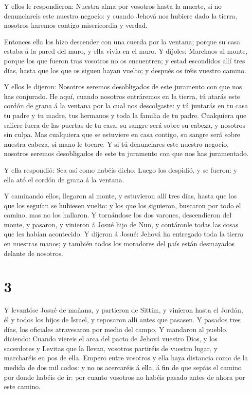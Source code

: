  Y ellos le respondieron: Nuestra alma por vosotros hasta
la muerte, si no denunciareis este nuestro negocio: y cuando Jehová nos
hubiere dado la tierra, nosotros haremos contigo misericordia y verdad.

 Entonces ella los hizo descender con una cuerda por la
ventana; porque su casa estaba á la pared del muro, y ella vivía en el
muro.  Y díjoles: Marchaos al monte, porque los que fueron
tras vosotros no os encuentren; y estad escondidos allí tres días, hasta
que los que os siguen hayan vuelto; y después os iréis vuestro camino.

 Y ellos le dijeron: Nosotros seremos desobligados de este
juramento con que nos has conjurado.  He aquí, cuando
nosotros entráremos en la tierra, tú atarás este cordón de grana á la
ventana por la cual nos descolgaste: y tú juntarás en tu casa tu padre y
tu madre, tus hermanos y toda la familia de tu padre. 
Cualquiera que saliere fuera de las puertas de tu casa, su sangre será
sobre su cabeza, y nosotros sin culpa. Mas cualquiera que se estuviere
en casa contigo, su sangre será sobre nuestra cabeza, si mano le tocare.
 Y si tú denunciares este nuestro negocio, nosotros seremos
desobligados de este tu juramento con que nos has juramentado.

 Y ella respondió: Sea así como habéis dicho. Luego los
despidió, y se fueron: y ella ató el cordón de grana á la ventana.

 Y caminando ellos, llegaron al monte, y estuvieron allí
tres días, hasta que los que los seguían se hubiesen vuelto: y los que
los siguieron, buscaron por todo el camino, mas no los hallaron.
 Y tornándose los dos varones, descendieron del monte, y
pasaron, y vinieron á Josué hijo de Nun, y contáronle todas las cosas
que les habían acontecido.  Y dijeron á Josué: Jehová ha
entregado toda la tierra en nuestras manos; y también todos los
moradores del país están desmayados delante de nosotros.

\hypertarget{section-2}{%
\section{3}\label{section-2}}

 Y levantóse Josué de mañana, y partieron de Sittim, y
vinieron hasta el Jordán, él y todos los hijos de Israel, y reposaron
allí antes que pasasen.  Y pasados tres días, los oficiales
atravesaron por medio del campo,  Y mandaron al pueblo,
diciendo: Cuando viereis el arca del pacto de Jehová vuestro Dios, y los
sacerdotes y Levitas que la llevan, vosotros partiréis de vuestro lugar,
y marcharéis en pos de ella.  Empero entre vosotros y ella
haya distancia como de la medida de dos mil codos: y no os acercaréis á
ella, á fin de que sepáis el camino por donde habéis de ir: por cuanto
vosotros no habéis pasado antes de ahora por este camino.

